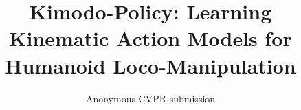 \documentclass[10pt,twocolumn,letterpaper]{article}
\title{Kimodo-Policy: Learning Kinematic Action Models for\\Humanoid Loco-Manipulation}
\author{Anonymous CVPR submission}
\begin{document}
\maketitle






\FloatBarrier

{\small


}
\end{document}

